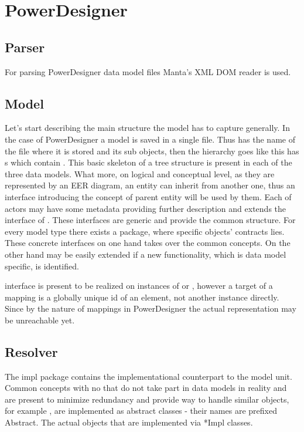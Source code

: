 \section{PowerDesigner}

\subsection{Parser}

For parsing PowerDesigner data model files Manta's XML DOM reader is used.

\subsection{Model}

Let's start describing the main structure the model has to capture generally.
In the case of PowerDesigner a model is saved in a single file. 
Thus  has the name of the file where it is stored and its sub objects, then the hierarchy goes like this  has s which contain .
This basic skeleton of a tree structure is present in each of the three data models. What more, on logical and conceptual level, as they are represented by an EER diagram, an entity can inherit from another one, thus an interface  introducing the concept of parent entity will be used by them. Each of actors may have some metadata providing further description and extends the interface of .
These interfaces are generic and provide the common structure.
For every model type there exists a package, where specific objects' contracts lies. These concrete interfaces on one hand takes over the common concepts. On the other hand may be easily extended if a new functionality, which is data model specific, is identified.

 interface is present to be realized on instances of  or  , however a target of a mapping is a globally unique id of an element, not another instance directly. Since by the nature of mappings in PowerDesigner the actual representation may be unreachable yet.

\subsection{Resolver}

The impl package contains the implementational counterpart to the model unit.
Common concepts with no that do not take part in data models in reality and are present to minimize redundancy and provide way to handle similar objects, for example , are implemented as abstract classes - their names are prefixed Abstract. The actual objects that are implemented via *Impl classes.

